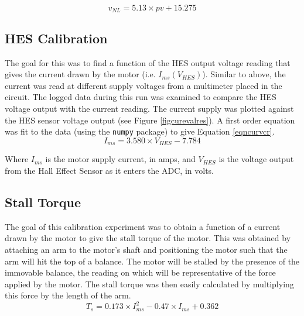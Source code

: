 \documentclass[twoside,a4]{report}
\begin{document}
	\begin{equation}
		v_{NL} = 5.13 \times pv + 15.275
		\label{eqnsvemp}
	\end{equation}
	
	
	\subsection*{HES Calibration}
	The goal for this was to find a function of the HES output voltage reading that gives the current drawn by the motor (i.e. \(I_{ms} ({V_{HES}})\)). Similar to above, the current was read at different supply voltages from a multimeter placed in the circuit. The logged data during this run was examined to compare the HES voltage output with the current reading. The current supply was plotted against the HES sensor voltage output (see Figure \ref{figcurevalres}). A first order equation was fit to the data (using the \texttt{numpy} package) to give Equation \ref{eqncurvcr}.
	\begin{equation}
		I_{ms} = 3.580 \times {V_{HES}} - 7.784
		\label{eqncurvcr}
	\end{equation}
	
	
	\noindent
	Where \(I_{ms}\) is the motor supply current, in amps, and \(V_{HES}\) is the voltage output from the Hall Effect Sensor as it enters the ADC, in volts.
	
	\subsection*{Stall Torque}
	The goal of this calibration experiment was to obtain a function of a current drawn by the motor to give the stall torque of the motor. This was obtained by attaching an arm to the motor's shaft and positioning the motor such that the arm will hit the top of a balance. The motor will be stalled by the presence of the immovable balance, the reading on which will be representative of the force applied by the motor. The stall torque was then easily calculated by multiplying this force by the length of the arm.
	\begin{equation}
		T_s = 0.173 \times I_{ms} ^2 -0.47 \times I_{ms} + 0.362
		\label{eqntsemp}
	\end{equation}
	
	
\end{document}
